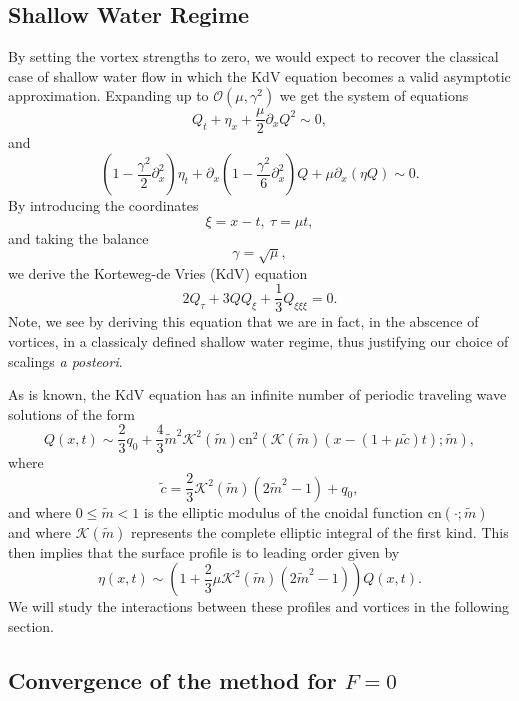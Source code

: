\documentclass[a4paper,11pt]{article}
\newcommand{\p}{\partial}
\begin{document}
\subsection{Shallow Water Regime}
By setting the vortex strengths to zero, we would expect to recover the classical 
case of shallow water flow in which the KdV equation becomes a valid asymptotic approximation.  
Expanding up to $\mathcal{O}(\mu,\gamma^{2})$ we get the system of equations 
\[
Q_{t} + \eta_{x} + \frac{\mu}{2}\p_{x}Q^{2} \sim 0, 
\]
and
\[
\left(1 - \frac{\gamma^{2}}{2}\p_{x}^{2}\right)\eta_{t} + \p_{x}\left(1-\frac{\gamma^{2}}{6}\p_{x}^{2} \right)Q + \mu \p_{x}(\eta Q) \sim 0.
\]
By introducing the coordinates
\[
\xi = x - t, ~ \tau = \mu t, 
\]
and taking the balance 
\[
\gamma = \sqrt{\mu}, 
\]
we derive the Korteweg-de Vries (KdV) equation
\[
2Q_{\tau} + 3QQ_{\xi} + \frac{1}{3} Q_{\xi\xi\xi} = 0.
\]
Note, we see by deriving this equation that we are in fact, in the abscence of vortices, in a classicaly defined shallow water regime, thus justifying our choice of scalings {\it a posteori}.  

As is known, the KdV equation has an infinite number of periodic traveling wave solutions of the form 
\begin{equation}
Q(x,t) \sim \frac{2}{3}q_{0} + \frac{4}{3} \tilde{m}^{2}\mathcal{K}^2(\tilde{m})\mbox{cn}^{2}\left(\mathcal{K}(\tilde{m}) \left( x- \left(1 + \mu \tilde{c}\right)t\right);\tilde{m}\right),
\label{kdvsolpot}
\end{equation}
where
\[
\tilde{c} = \frac{2}{3}\mathcal{K}^{2}(\tilde{m}) (2\tilde{m}^{2}-1)+q_{0},
\]
and where $0\leq \tilde{m}<1$ is the elliptic modulus of the cnoidal function $\mbox{cn}(\cdot;\tilde{m})$ and where $\mathcal{K}(\tilde{m})$ represents the complete elliptic integral of the first kind.  This then implies that the surface profile is to leading order given by 
\begin{equation}
\eta(x,t) \sim \left(1+\frac{2}{3}\mu \mathcal{K}^{2}(\tilde{m})(2\tilde{m}^{2}-1)\right)Q(x,t).
\label{kdvsolsurf}
\end{equation}
We will study the interactions between these profiles and vortices in the following section.  
\subsection{Convergence of the method for $F=0$}
\end{document}
